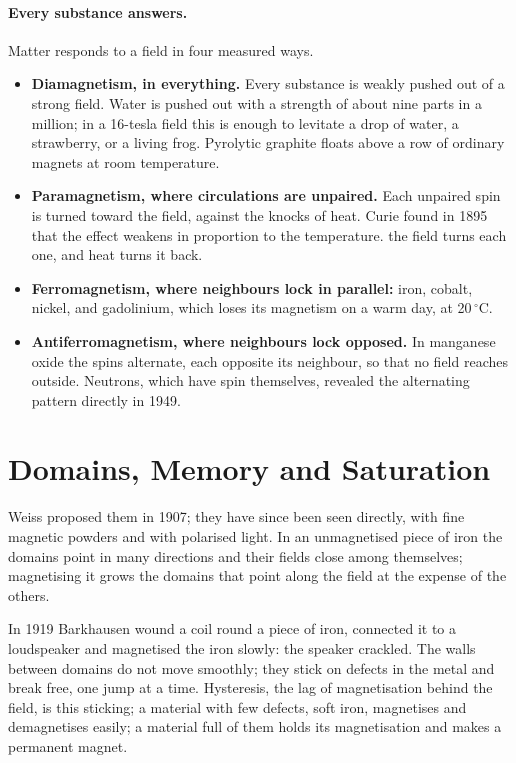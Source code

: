 \documentclass[11pt,a4paper]{article}
\begin{document}
\paragraph{Every substance answers.} Matter responds to a field in four measured ways.
\begin{itemize}
\item \textbf{Diamagnetism, in everything.} Every substance is weakly pushed out of a strong field. Water is pushed out with a strength of about nine parts in a million; in a 16-tesla field this is enough to levitate a drop of water, a strawberry, or a living frog. Pyrolytic graphite floats above a row of ordinary magnets at room temperature. 
\item \textbf{Paramagnetism, where circulations are unpaired.} Each unpaired spin is turned toward the field, against the knocks of heat. Curie found in 1895 that the effect weakens in proportion to the temperature.  the field turns each one, and heat turns it back.
\item \textbf{Ferromagnetism, where neighbours lock in parallel:} iron, cobalt, nickel, and gadolinium, which loses its magnetism on a warm day, at 20\,$^\circ$C.
\item \textbf{Antiferromagnetism, where neighbours lock opposed.} In manganese oxide the spins alternate, each opposite its neighbour, so that no field reaches outside. Neutrons, which have spin themselves, revealed the alternating pattern directly in 1949.
\end{itemize}

\section{Domains, Memory and Saturation}
\label{sec:domains}

 Weiss proposed them in 1907; they have since been seen directly, with fine magnetic powders and with polarised light. In an unmagnetised piece of iron the domains point in many directions and their fields close among themselves; magnetising it grows the domains that point along the field at the expense of the others.

 In 1919 Barkhausen wound a coil round a piece of iron, connected it to a loudspeaker and magnetised the iron slowly: the speaker crackled. The walls between domains do not move smoothly; they stick on defects in the metal and break free, one jump at a time.  Hysteresis, the lag of magnetisation behind the field, is this sticking; a material with few defects, soft iron, magnetises and demagnetises easily; a material full of them holds its magnetisation and makes a permanent magnet.
\end{document}
